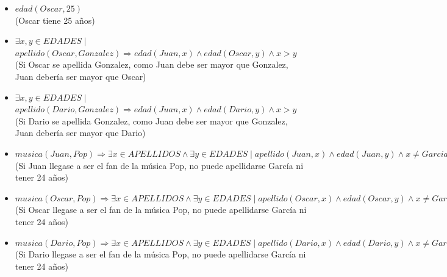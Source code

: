 \documentclass[12pt]{article}
\begin{document}
\begin{itemize}
\begin{itemize}
\item $edad(Oscar, 25)$ \\ (Oscar tiene 25 años)
\item $\exists x,y \in EDADES \mid$ \\ $ apellido(Oscar, Gonzalez) \Rightarrow edad(Juan,x) \land edad(Oscar,y) \land x > y$ \\ (Si Oscar se apellida Gonzalez, como Juan debe ser mayor que Gonzalez, Juan debería ser mayor que Oscar)
\item $\exists x,y \in EDADES \mid$ \\ $ apellido(Dario, Gonzalez) \Rightarrow edad(Juan,x) \land edad(Dario,y) \land x > y$ \\ (Si Dario se apellida Gonzalez, como Juan debe ser mayor que Gonzalez, Juan debería ser mayor que Dario)
\item $musica(Juan, Pop) \Rightarrow \exists x \in APELLIDOS \land \exists y \in EDADES \mid apellido(Juan, x) \land edad(Juan, y) \land x \neq Garcia \land y \neq 24$ \\
(Si Juan llegase a ser el fan de la música Pop, no puede apellidarse García ni tener 24 años)
\item $musica(Oscar, Pop) \Rightarrow \exists x \in APELLIDOS \land \exists y \in EDADES \mid apellido(Oscar, x) \land edad(Oscar, y) \land x \neq Garcia \land y \neq 24$ \\
(Si Oscar llegase a ser el fan de la música Pop, no puede apellidarse García ni tener 24 años)
\item $musica(Dario, Pop) \Rightarrow \exists x \in APELLIDOS \land \exists y \in EDADES \mid apellido(Dario, x) \land edad(Dario, y) \land x \neq Garcia \land y \neq 24$ \\
(Si Dario llegase a ser el fan de la música Pop, no puede apellidarse García ni tener 24 años)
\end{itemize}
\end{itemize}
\end{document}
